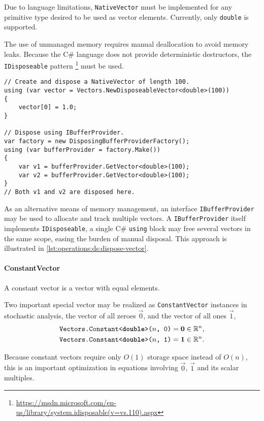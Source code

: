 Due to language limitations, \texttt{NativeVector} must be implemented
for any primitive type desired to be used as vector
elements. Currently, only \texttt{double} is supported.

The use of unmanaged memory requires manual deallocation to avoid
memory leaks. Because the C\# language does not provide deterministic
destructors, the \texttt{IDisposeable} pattern%
\footnote{\url{https://msdn.microsoft.com/en-us/library/system.idisposable(v=vs.110).aspx}}
must be used.

\begin{lstlisting}[float,caption={Manual memory management for
    \texttt{NativeVector}.},label=lst:operations:ds:dispose-vector]
// Create and dispose a NativeVector of length 100.
using (var vector = Vectors.NewDisposeableVector<double>(100))
{
	vector[0] = 1.0;
}

// Dispose using IBufferProvider.
var factory = new DisposingBufferProviderFactory();
using (var bufferProvider = factory.Make())
{
	var v1 = bufferProvider.GetVector<double>(100);
	var v2 = bufferProvider.GetVector<double>(100);
}
// Both v1 and v2 are disposed here.
\end{lstlisting}

As an alternative means of memory management, an interface
\texttt{IBufferProvider} may be used to allocate and track multiple
vectors. A \texttt{IBufferProvider} itself implements
\texttt{IDisposeable}, a single C\# \texttt{using} block may free
several vectors in the same scope, easing the burden of manual
disposal. This approach is illustrated in
\cref{lst:operations:ds:dispose-vector}.

\paragraph{ConstantVector}

A constant vector is a vector with equal elements.

Two important special vector may be realized as
\texttt{ConstantVector} instances in stochastic analysis, the vector
of all zeroes $\vec{0}$, and the vector of all ones $\vec{1}$,
\begin{align}
  \texttt{Vectors.Constant<\textbf{double}>($n$, 0)}
  &= \bm{\mathrm{0}} \in \mathbb{R}^n \text, \\
  \texttt{Vectors.Constant<\textbf{double}>($n$, 1)}
  &= \bm{\mathrm{1}} \in \mathbb{R}^n \text.
\end{align}

Because constant vectors require only $O(1)$ storage space instead of
$O(n)$, this is an important optimization in equations involving
$\vec{0}$, $\vec{1}$ and its scalar multiples.

